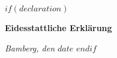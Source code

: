 
$if(declaration)$
\cleardoublepage

\thispagestyle{empty}

\vspace*{\fill}

\textbf{Eidesstattliche Erklärung}


\vspace{20mm}

\noindent\textit{Bamberg, den $date$}
$endif$
